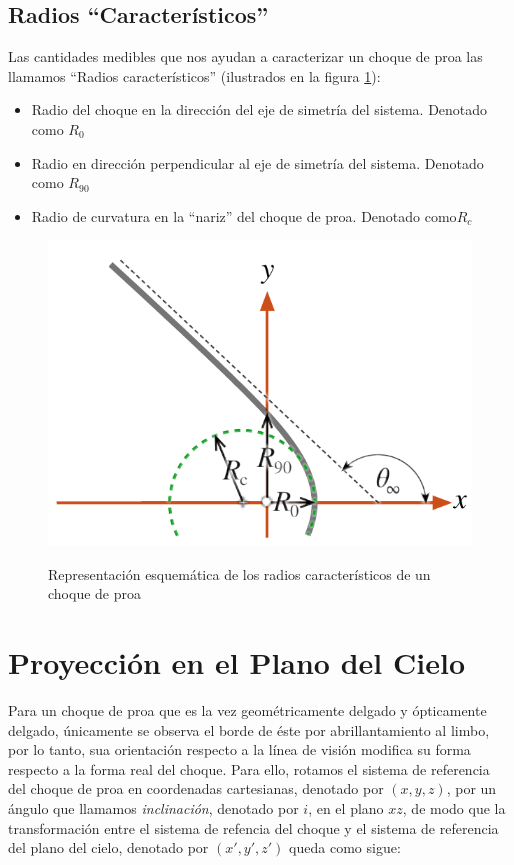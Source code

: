 \subsection{Radios ``Caracter\'isticos''}

Las cantidades medibles que nos ayudan a caracterizar un choque de proa las
llamamos ``Radios caracter\'isticos'' (ilustrados en la figura
\ref{fig:char-radii}):
\begin{itemize}
\item Radio del choque en la direcci\'on del eje de simetr\'ia del sistema.
  Denotado como $R_0$
\item Radio en direcci\'on perpendicular al eje de simetr\'ia del sistema.
  Denotado como $R_{90}$
\item Radio de curvatura en la ``nariz'' del choque de proa. Denotado
  como$ R_c$
\end{itemize}

\begin{figure}
  \includegraphics[width=\linewidth]{./Figures/characteristic-radii}
  \label{fig:char-radii}
  \caption{Representaci\'on esquem\'atica de los radios caracter\'isticos
  de un choque de proa}
\end{figure}



\section{Proyecci\'on en el Plano del Cielo}

Para un choque de proa que es la vez geom\'etricamente delgado y
\'opticamente delgado, \'unicamente se observa el borde de \'este por
abrillantamiento al limbo, por lo tanto, sua orientaci\'on respecto a
la l\'inea de visi\'on modifica su forma respecto a la forma real del
choque. Para ello, rotamos el sistema de referencia del choque de proa
en coordenadas cartesianas, denotado por $(x, y, z)$, por un \'angulo
que llamamos \textit{inclinaci\'on}, denotado por $i$, en el plano $xz$,
de modo que la transformaci\'on entre el sistema de refencia del choque
y el sistema de referencia del plano del cielo, denotado por
$(x', y', z')$ queda como sigue:

